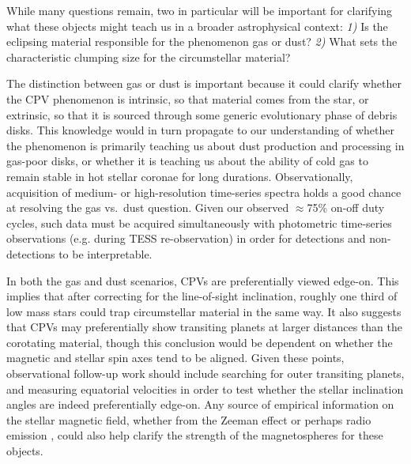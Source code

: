 \documentclass[11pt,twocolumn,tighten]{aastex63}
\begin{document}

While many questions remain, two in particular will be important for
clarifying what these objects might teach us in a broader
astrophysical context: {\it 1)} Is the eclipsing material responsible
for the phenomenon gas or dust?  {\it 2)} What sets the characteristic
clumping size for the circumstellar material?

The distinction between gas or dust is important because it could
clarify whether the CPV phenomenon is intrinsic, so that material
comes from the star, or extrinsic, so that it is sourced through some
generic evolutionary phase of debris disks.  This knowledge would in
turn propagate to our understanding of whether the phenomenon is
primarily teaching us about dust production and processing in gas-poor
disks, or whether it is teaching us about the ability of cold gas to
remain stable in hot stellar coronae for long durations.
Observationally, acquisition of medium- or high-resolution time-series
spectra holds a good chance at resolving the gas vs.~dust question.
Given our observed $\approx$75\% on-off duty cycles, such data must be
acquired simultaneously with photometric time-series observations
(e.g. during TESS re-observation) in order for detections and
non-detections to be interpretable.

In both the gas and dust scenarios, CPVs are preferentially viewed
edge-on.  This implies that after correcting for the line-of-sight
inclination, roughly one third of low mass stars \citep[those that
rotate rapidly enough;][]{2022AJ....163..144G} could trap
circumstellar material in the same way.  It also suggests that CPVs
may preferentially show transiting planets at larger distances than
the corotating material, though this conclusion would be dependent on
whether the magnetic and stellar spin axes tend to be aligned.  Given
these points, observational follow-up work should include searching
for outer transiting planets, and measuring equatorial velocities in
order to test whether the stellar inclination angles are indeed
preferentially edge-on.  Any source of empirical information on the
stellar magnetic field, whether from the Zeeman effect
\citep[e.g.][]{2021A&ARv..29....1K} or perhaps radio emission
\citep[e.g.][]{2015Natur.523..568H}, could also help clarify the
strength of the magnetospheres for these objects.
\end{document}
